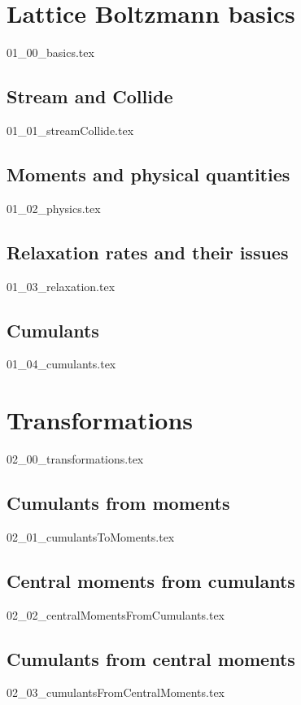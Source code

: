 \documentclass[12pt,a4paper,twoside]{article}
\begin{document}
\section{Lattice Boltzmann basics}
\label{sec: Lattice Boltzmann basics}
{01_00_basics.tex}

\subsection{Stream and Collide}
\label{sub: Stream and Collide}
{01_01_streamCollide.tex}

\subsection{Moments and physical quantities}
\label{sub: Moments and physical quantities}
{01_02_physics.tex}

\subsection{Relaxation rates and their issues}
\label{sub: Relaxation rates and their issues}
{01_03_relaxation.tex}

\subsection{Cumulants}
\label{sub: Cumulants}
{01_04_cumulants.tex}

\section{Transformations}
\label{sec: Transformations}
{02_00_transformations.tex}

\subsection{Cumulants from moments}
\label{sub: Cumulants from moments}
{02_01_cumulantsToMoments.tex}

\subsection{Central moments from cumulants}
\label{sub: Central moments from cumulants}
{02_02_centralMomentsFromCumulants.tex}

\subsection{Cumulants from central moments}
\label{sub: Cumulants from central moments}
{02_03_cumulantsFromCentralMoments.tex}
\end{document}
